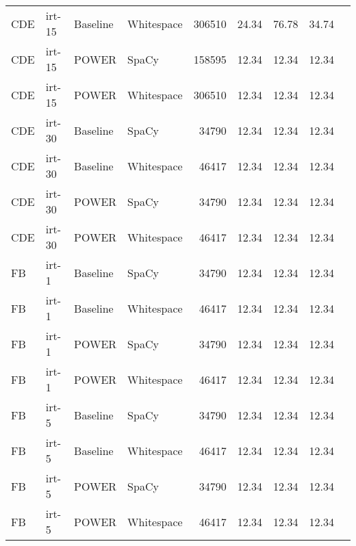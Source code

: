\begin{tabular}{| l | l | l | l | r | r | r | r | r |}
    CDE & irt-15 & Baseline & Whitespace & \num{306510} &
    24.34 & 76.78 & 34.74 \\

    CDE & irt-15 & POWER & SpaCy & \num{158595} & 12.34 &
    12.34 & 12.34 \\

    CDE & irt-15 & POWER & Whitespace & \num{306510} &
    12.34 & 12.34 & 12.34 \\

    \hline

    CDE & irt-30 & Baseline & SpaCy & \num{34790} &
    12.34 & 12.34 & 12.34 \\

    CDE & irt-30 & Baseline & Whitespace & \num{46417} &
    12.34 & 12.34 & 12.34 \\

    CDE & irt-30 & POWER & SpaCy & \num{34790} & 12.34 &
    12.34 & 12.34 \\

    CDE & irt-30 & POWER & Whitespace & \num{46417} &
    12.34 & 12.34 & 12.34 \\

    \hline \hline

    FB & irt-1 & Baseline & SpaCy & \num{34790} &
    12.34 & 12.34 & 12.34 \\

    FB & irt-1 & Baseline & Whitespace & \num{46417} &
    12.34 & 12.34 & 12.34 \\

    FB & irt-1 & POWER & SpaCy & \num{34790} & 12.34 &
    12.34 & 12.34 \\

    FB & irt-1 & POWER & Whitespace & \num{46417} &
    12.34 & 12.34 & 12.34 \\

    \hline

    FB & irt-5 & Baseline & SpaCy & \num{34790} &
    12.34 & 12.34 & 12.34 \\

    FB & irt-5 & Baseline & Whitespace & \num{46417} &
    12.34 & 12.34 & 12.34 \\

    FB & irt-5 & POWER & SpaCy & \num{34790} & 12.34 &
    12.34 & 12.34 \\

    FB & irt-5 & POWER & Whitespace & \num{46417} &
    12.34 & 12.34 & 12.34 \\

    \hline


\end{tabular}
